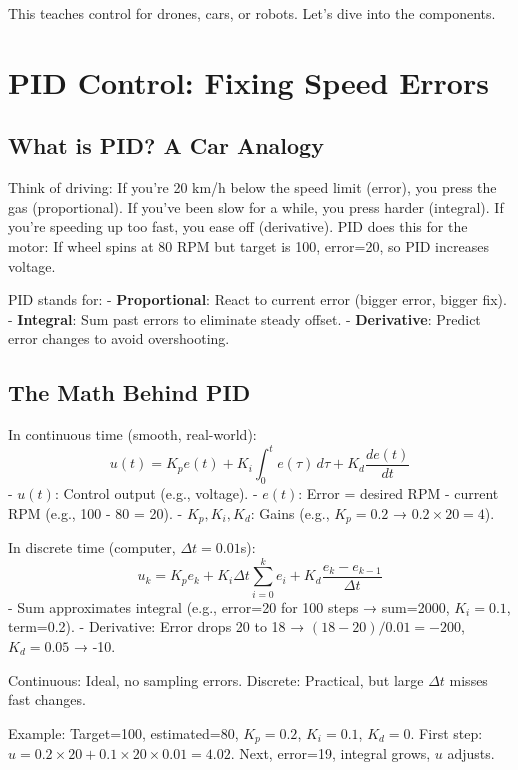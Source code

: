 \documentclass[conference]{IEEEtran}
\begin{document}
	This teaches control for drones, cars, or robots. Let's dive into the components.
	
	\section{PID Control: Fixing Speed Errors}
	\label{sec:pid}
	
	\subsection{What is PID? A Car Analogy}
	Think of driving: If you're 20 km/h below the speed limit (error), you press the gas (proportional). If you've been slow for a while, you press harder (integral). If you're speeding up too fast, you ease off (derivative). PID does this for the motor: If wheel spins at 80 RPM but target is 100, error=20, so PID increases voltage.
	
	PID stands for:
	- \textbf{Proportional}: React to current error (bigger error, bigger fix).
	- \textbf{Integral}: Sum past errors to eliminate steady offset.
	- \textbf{Derivative}: Predict error changes to avoid overshooting.
	
	\subsection{The Math Behind PID}
	In continuous time (smooth, real-world):
	\begin{equation}
		u(t) = K_p e(t) + K_i \int_0^t e(\tau) \, d\tau + K_d \frac{de(t)}{dt}
	\end{equation}
	- $u(t)$: Control output (e.g., voltage).
	- $e(t)$: Error = desired RPM - current RPM (e.g., 100 - 80 = 20).
	- $K_p, K_i, K_d$: Gains (e.g., $K_p=0.2$ → $0.2 \times 20 = 4$).
	
	In discrete time (computer, $\Delta t = 0.01$s):
	\begin{equation}
		u_k = K_p e_k + K_i \Delta t \sum_{i=0}^k e_i + K_d \frac{e_k - e_{k-1}}{\Delta t}
	\end{equation}
	- Sum approximates integral (e.g., error=20 for 100 steps → sum=2000, $K_i=0.1$, term=0.2).
	- Derivative: Error drops 20 to 18 → $(18-20)/0.01 = -200$, $K_d=0.05$ → -10.
	
	Continuous: Ideal, no sampling errors. Discrete: Practical, but large $\Delta t$ misses fast changes.
	
	Example: Target=100, estimated=80, $K_p=0.2$, $K_i=0.1$, $K_d=0$. First step: $u=0.2 \times 20 + 0.1 \times 20 \times 0.01 = 4.02$. Next, error=19, integral grows, $u$ adjusts.
	
\end{document}
